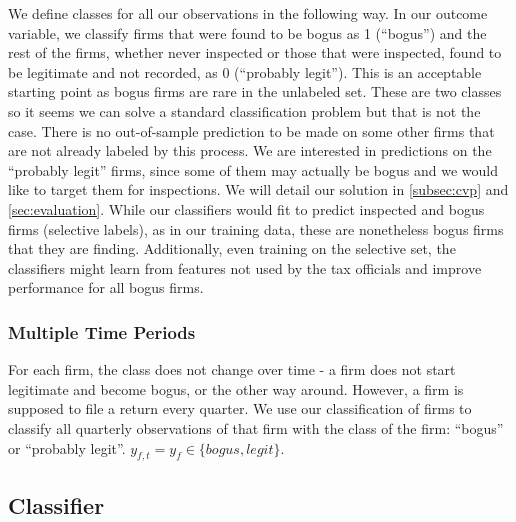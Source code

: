 We define classes for all our observations in the following way. In our outcome variable, we classify firms that were found to be bogus as 1 (``bogus'') and the rest of the firms, whether never inspected or those that were inspected, found to be legitimate and not recorded, as 0 (``probably legit''). This is an acceptable starting point as bogus firms are rare in the unlabeled set. These are two classes so it seems we can solve a standard classification problem but that is not the case. There is no out-of-sample prediction to be made on some other firms that are not already labeled by this process. We are interested in predictions on the ``probably legit'' firms, since some of them may actually be bogus and we would like to target them for inspections. We will detail our solution in \cref{subsec:cvp} and \cref{sec:evaluation}. While our classifiers would fit to predict inspected and bogus firms (selective labels), as in our training data, these are nonetheless bogus firms that they are finding. Additionally, even training on the selective set, the classifiers might learn from features not used by the tax officials and improve performance for all bogus firms.

\subsubsection{Multiple Time Periods}
\label{subsubsec:multiple-time}
For each firm, the class does not change over time - a firm does not start legitimate and become bogus, or the other way around. However, a firm is supposed to file a return every quarter. We use our classification of firms to classify all quarterly observations of that firm with the class of the firm: ``bogus'' or ``probably legit''. $y_{f,t}=y_f \in \{bogus,legit\}$.


\subsection{Classifier}
\label{subsec:classifier}

